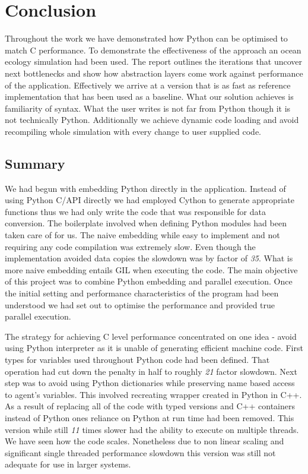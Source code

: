 \documentclass[12pt, a4paper]{report}
\begin{document}
\chapter{Conclusion}\label{ch:concl}
Throughout the work we have demonstrated how Python can be optimised to match
C performance. To demonstrate the effectiveness of the approach an
ocean ecology simulation had been used. The report outlines the iterations
that uncover next bottlenecks and show how abstraction layers come work
against performance of the application. Effectively we arrive at a version
that is as fast as reference implementation that has been used as a baseline.
What our solution achieves is familiarity of syntax. What the user writes
is not far from Python though it is not technically Python. Additionally
we achieve dynamic code loading and avoid recompiling whole simulation
with every change to user supplied code.

\section{Summary}\label{sec:summary}
We had begun with embedding Python directly in the application. Instead of
using Python C/API directly we had employed Cython to generate appropriate
functions thus we had only write the code that was responsible for data
conversion. The boilerplate involved when defining Python modules had
been taken care of for us. The naive embedding while easy to implement
and not requiring any code compilation was extremely slow. Even though
the implementation avoided data copies the slowdown was by factor of \emph{35}.
What is more naive embedding entails GIL when executing the code. The
main objective of this project was to combine Python embedding and
parallel execution. Once the initial setting and performance characteristics
of the program had been understood we had set out to optimise the performance
and provided true parallel execution.

The strategy for achieving C level performance concentrated on one idea -
avoid using Python interpreter as it is unable of generating efficient
machine code. First types for variables used throughout Python code had
been defined. That operation had cut down the penalty in half to roughly
\emph{21} factor slowdown. Next step was to avoid using Python dictionaries
while preserving name based access to agent's variables. This involved
recreating wrapper created in Python in C++. As a result of replacing
all of the code with typed versions and C++ containers instead of Python
ones reliance on Python at run time had been removed. This version while
still \emph{11} times slower had the ability to execute on multiple threads.
We have seen how the code scales. Nonetheless due to non linear scaling
and significant single threaded performance slowdown this version was
still not adequate for use in larger systems.
\end{document}
